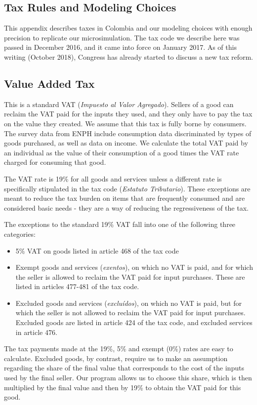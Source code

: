 \documentclass[12pt]{article}
\begin{document}
\begin{appendices}
\section{Tax Rules and Modeling Choices}
This appendix describes taxes in Colombia and our modeling choices
with enough precision to replicate our microsimulation.
The tax code we describe here was passed in December 2016,
and it came into force on January 2017.
As of this writing (October 2018),
Congress has already started to discuss a new tax reform.


\subsection{Value Added Tax}
This is a standard VAT (\textit{Impuesto al Valor Agregado}).
Sellers of a good can reclaim the VAT paid for the inputs they used,
and they only have to pay the tax on the value they created.
We assume that this tax is fully borne by consumers.
The survey data from ENPH include consumption data
discriminated by types of goods purchased,
as well as data on income.
We calculate the total VAT paid by an individual
as the value of their consumption of a good
times the VAT rate charged for consuming that good.

The VAT rate is 19\% for all goods and services
unless a different rate is specifically stipulated in the tax code
(\textit{Estatuto Tributario}).
These exceptions are meant to reduce the tax burden
on items that are frequently consumed and are considered basic needs
- they are a way of reducing the regressiveness of the tax.

The exceptions to the standard 19\% VAT fall into one of the following three categories:
\begin{itemize}
\item 5\% VAT on goods listed in article 468 of the tax code
\item Exempt goods and services (\textit{exentos}),
  on which no VAT is paid,
  and for which the seller is allowed to reclaim
  the VAT paid for input purchases.
  These are listed in articles 477-481 of the tax code.
\item Excluded goods and services (\textit{exclu\'{i}dos}),
  on which no VAT is paid,
  but for which the seller is not allowed to reclaim
  the VAT paid for input purchases.
  Excluded goods are listed in article 424 of the tax code,
  and excluded services in article 476.
\end{itemize}

The tax payments made at the 19\%, 5\% and exempt (0\%) rates
are easy to calculate.
Excluded goods, by contrast, require us to make an assumption regarding
the share of the final value that corresponds to
the cost of the inputs used by the final seller.
Our program allows us to choose this share,
which is then multiplied by the final value and then by 19\%
to obtain the VAT paid for this good.


\end{appendices}
\end{document}
